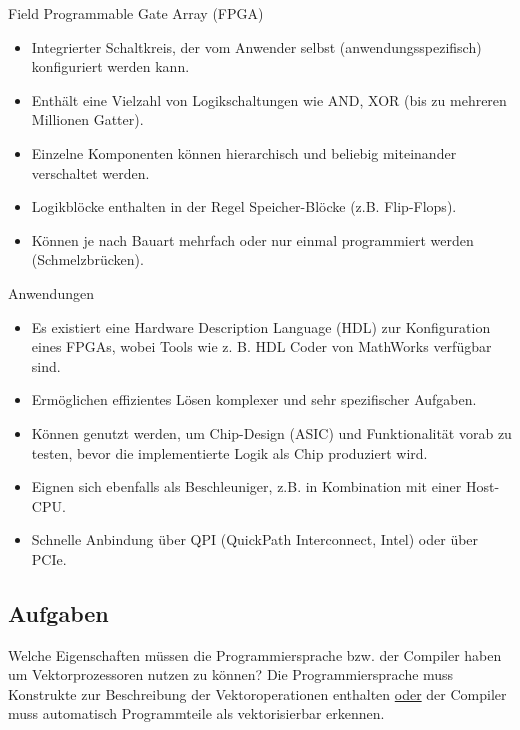 \begin{defi}{Field Programmable Gate Array (FPGA)}
    \begin{itemize}
        \item Integrierter Schaltkreis, der vom Anwender selbst (anwendungsspezifisch) konfiguriert werden kann.
        \item Enthält eine Vielzahl von Logikschaltungen wie AND, XOR (bis zu mehreren Millionen Gatter).
        \item Einzelne Komponenten können hierarchisch und beliebig miteinander verschaltet werden.
        \item Logikblöcke enthalten in der Regel Speicher-Blöcke (z.B. Flip-Flops).
        \item Können je nach Bauart mehrfach oder nur einmal programmiert werden (Schmelzbrücken).
    \end{itemize}
\end{defi}

\begin{defi}{Anwendungen}
    \begin{itemize}
        \item Es existiert eine Hardware Description Language (HDL) zur Konfiguration eines FPGAs, wobei Tools wie z. B. HDL Coder von MathWorks verfügbar sind.
        \item Ermöglichen effizientes Lösen komplexer und sehr spezifischer Aufgaben.
        \item Können genutzt werden, um Chip-Design (ASIC) und Funktionalität vorab zu testen, bevor die implementierte Logik als Chip produziert wird.
        \item Eignen sich ebenfalls als Beschleuniger, z.B. in Kombination mit einer Host-CPU.
        \item Schnelle Anbindung über QPI (QuickPath Interconnect, Intel) oder über PCIe.
    \end{itemize}
\end{defi}

\subsection{Aufgaben}

{
    Welche Eigenschaften müssen die Programmiersprache bzw. der Compiler haben um Vektorprozessoren nutzen zu können?
}
{
    Die Programmiersprache muss Konstrukte zur Beschreibung der Vektoroperationen enthalten
    \underline{oder} der Compiler muss automatisch Programmteile als vektorisierbar erkennen.
}

